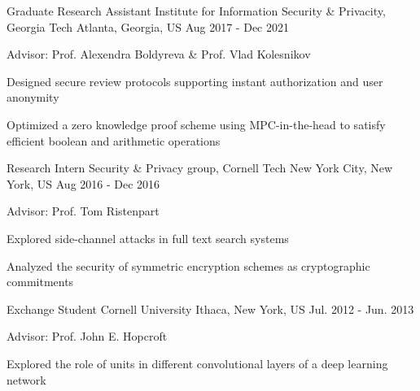 


\begin{cventries}


\cventry
{Graduate Research Assistant} %
{Institute for Information Security \& Privacity, Georgia Tech} %
{Atlanta, Georgia, US} %
{Aug 2017 - Dec 2021} %
{ %
\begin{cvitems}
\item {Advisor: Prof. Alexendra Boldyreva \& Prof. Vlad Kolesnikov}
\item {Designed secure review protocols supporting instant authorization and user anonymity}
\item {Optimized a zero knowledge proof scheme using MPC-in-the-head to satisfy efficient boolean and arithmetic operations}
\end{cvitems}
}


\cventry
{Research Intern} %
{Security \& Privacy group, Cornell Tech} %
{New York City, New York, US} %
{Aug 2016 - Dec 2016} %
{ %
\begin{cvitems}
\item {Advisor: Prof. Tom Ristenpart}
\item {Explored side-channel attacks in full text search systems}
\item {Analyzed the security of symmetric encryption schemes as cryptographic commitments}
\end{cvitems}
}


\cventry
{Exchange Student} %
{Cornell University} %
{Ithaca, New York, US} %
{Jul. 2012 - Jun. 2013} %
{ %
	\begin{cvitems}
		\item {Advisor: Prof. John E. Hopcroft}
		\item {Explored the role of units in different convolutional layers of a deep learning network}
	\end{cvitems}
}


\end{cventries}
